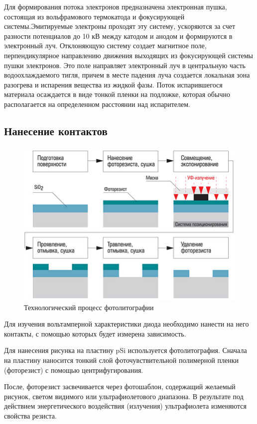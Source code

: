 \documentclass[a4paper,12pt]{article}
\begin{document}
Для формирования потока электронов предназначена электронная пушка, состоящая из вольфрамового термокатода и фокусирующей системы.Эмитируемые электроны проходят эту систему, ускоряются за счет разности потенциалов до 10 кВ между катодом и анодом и формируются в электронный луч. Отклоняющую систему создает магнитное поле, перпендикулярное направлению движения выходящих из фокусирующей системы пушки электронов. Это поле направляет электронный луч в центральную часть водоохлаждаемого тигля, причем в месте падения луча создается локальная зона разогрева и испарения вещества из жидкой фазы. Поток испарившегося материала осаждается в виде тонкой пленки на подложке, которая обычно располагается на определенном расстоянии над испарителем.

\subsection{Нанесение контактов}

\begin{figure} 						    \includegraphics[width=\linewidth]{fig4}
	\caption{Технологический процесс фотолитографии}
\end{figure}

Для изучения вольтамперной характеристики диода необходимо нанести на него контакты, с помощью которых будет измерена зависимость.

Для нанесения рисунка на пластину pSi используется фотолитография. Сначала на пластину наносится тонкий слой фоточувствительной полимерной пленки (фоторезист) с помощью центрифугирования.

После, фоторезист засвечивается через фотошаблон, содержащий желаемый рисунок, светом видимого или ультрафиолетового диапазона. В результате под действием энергетического воздействия (излучения)
ультрафиолета изменяются свойства резиста.
\end{document}
